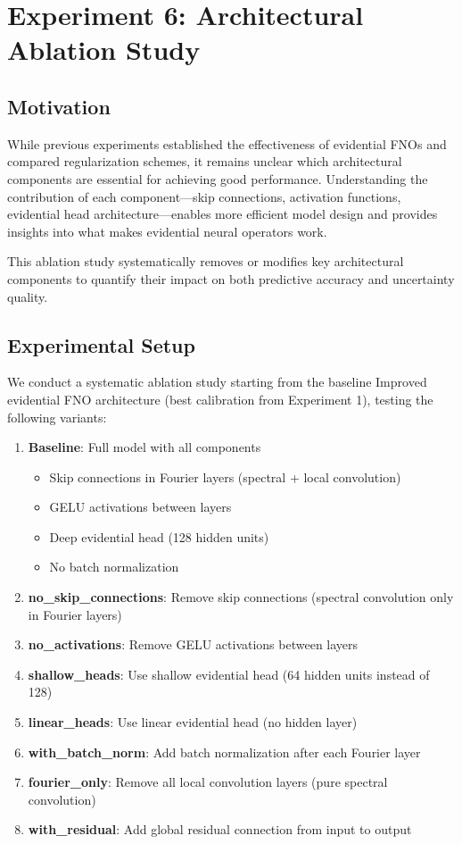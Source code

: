 \section{Experiment 6: Architectural Ablation Study}

\subsection{Motivation}

While previous experiments established the effectiveness of evidential FNOs and compared regularization schemes, it remains unclear which architectural components are essential for achieving good performance. Understanding the contribution of each component—skip connections, activation functions, evidential head architecture—enables more efficient model design and provides insights into what makes evidential neural operators work.

This ablation study systematically removes or modifies key architectural components to quantify their impact on both predictive accuracy and uncertainty quality.

\subsection{Experimental Setup}

We conduct a systematic ablation study starting from the baseline Improved evidential FNO architecture (best calibration from Experiment 1), testing the following variants:

\begin{enumerate}
\item \textbf{Baseline}: Full model with all components
\begin{itemize}
\item Skip connections in Fourier layers (spectral + local convolution)
\item GELU activations between layers
\item Deep evidential head (128 hidden units)
\item No batch normalization
\end{itemize}

\item \textbf{no\_skip\_connections}: Remove skip connections (spectral convolution only in Fourier layers)
\item \textbf{no\_activations}: Remove GELU activations between layers
\item \textbf{shallow\_heads}: Use shallow evidential head (64 hidden units instead of 128)
\item \textbf{linear\_heads}: Use linear evidential head (no hidden layer)
\item \textbf{with\_batch\_norm}: Add batch normalization after each Fourier layer
\item \textbf{fourier\_only}: Remove all local convolution layers (pure spectral convolution)
\item \textbf{with\_residual}: Add global residual connection from input to output
\end{enumerate}

